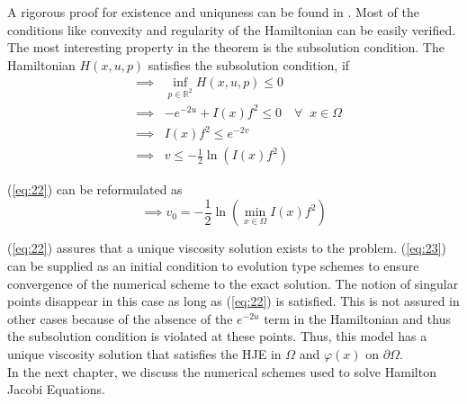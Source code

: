 \noindent
A rigorous proof for existence and uniquness can be found
in \cite{prados2}. Most of the conditions like convexity and regularity of the
Hamiltonian can be easily verified. The most interesting property in
the theorem is the subsolution condition. The Hamiltonian $H(x,u,p)$
satisfies the subsolution condition, if
\begin{eqnarray}
  &\implies&\inf_{p\in\mathbb{R}^2}H(x,u,p) \le 0 \\
  &\implies& -e^{-2u} + I(x)f^2 \le 0 \quad \forall \;\; x \in \Omega\\
  &\implies& I(x)f^2 \le e^{-2v} \\
  &\implies& v \le -\frac{1}{2} \ln (I(x)f^2) \label{eq:22}
\end{eqnarray}

\noindent
(\ref{eq:22}) can be reformulated as
\begin{equation}
  \implies v_0 = -\frac{1}{2}\ln(\min_{x\in\Omega} I(x)f^2) \label{eq:23}
\end{equation}

\noindent
(\ref{eq:22}) assures that a unique viscosity solution exists to the
problem. (\ref{eq:23}) can be supplied as an initial condition to evolution
type schemes to ensure convergence of the numerical scheme to the
exact solution. The notion of singular points disappear in this case as
long as (\ref{eq:22}) is satisfied. This is not assured in other cases\cite{prados1,prad,prad2}
because of the absence of the $e^{-2u}$ term in the Hamiltonian and
thus the subsolution condition is violated at these points. Thus, this
model has a unique viscosity solution that satisfies the HJE in
$\Omega$ and $\varphi(x)$ on $\partial \Omega$.\\

\noindent
In the next chapter, we discuss the numerical schemes used to solve
Hamilton Jacobi Equations.
